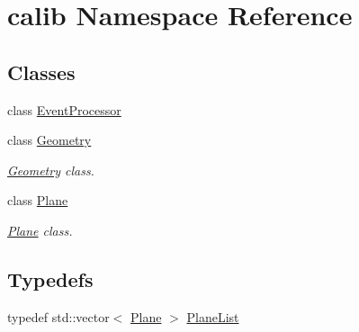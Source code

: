 \hypertarget{namespacecalib}{\section{calib Namespace Reference}
\label{namespacecalib}
}
\subsection*{Classes}
\begin{DoxyCompactItemize}
\item 
class \hyperlink{classcalib_1_1EventProcessor}{Event\-Processor}
\item 
class \hyperlink{classcalib_1_1Geometry}{Geometry}
\begin{DoxyCompactList}\small\item\em \hyperlink{classcalib_1_1Geometry}{Geometry} class. \end{DoxyCompactList}\item 
class \hyperlink{classcalib_1_1Plane}{Plane}
\begin{DoxyCompactList}\small\item\em \hyperlink{classcalib_1_1Plane}{Plane} class. \end{DoxyCompactList}\end{DoxyCompactItemize}
\subsection*{Typedefs}
\begin{DoxyCompactItemize}
\item 
typedef std\-::vector$<$ \hyperlink{classcalib_1_1Plane}{Plane} $>$ \hyperlink{namespacecalib_a007f645ec5958ddca8582afe498adc1c}{Plane\-List}
\end{DoxyCompactItemize}

